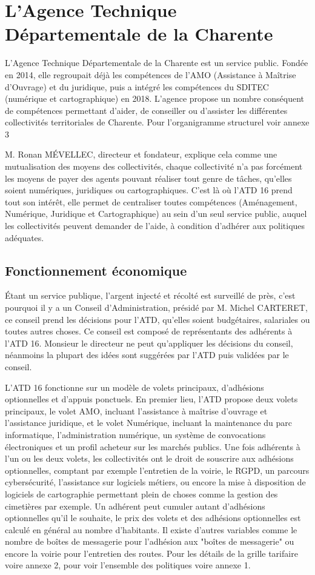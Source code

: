 \documentclass[a4paper,12pt]{report}
\begin{document}
\section{L'Agence Technique Départementale de la Charente}
L'Agence Technique Départementale de la Charente est un service public. Fondée en 2014, elle regroupait déjà les compétences de l'AMO (Assistance à Maîtrise d'Ouvrage) et du juridique, puis a intégré les compétences du SDITEC (numérique et cartographique) en 2018. L'agence propose un nombre conséquent de compétences permettant d'aider, de conseiller ou d'assister les différentes collectivités territoriales de Charente. Pour l'organigramme structurel voir annexe 3


M. Ronan MÉVELLEC, directeur et fondateur, explique cela comme une mutualisation des moyens des collectivités, chaque collectivité n'a pas forcément les moyens de payer des agents pouvant réaliser tout genre de tâches, qu'elles soient numériques, juridiques ou cartographiques. C'est là où l'ATD 16 prend tout son intérêt, elle permet de centraliser toutes compétences (Aménagement, Numérique, Juridique et Cartographique) au sein d'un seul service public, auquel les collectivités peuvent demander de l'aide, à condition d'adhérer aux politiques adéquates.

\subsection{Fonctionnement économique}

Étant un service publique, l'argent injecté et récolté est surveillé de près, c'est pourquoi il y a un Conseil d'Administration, présidé par M. Michel CARTERET, ce conseil prend les décisions pour l'ATD, qu'elles soient budgétaires, salariales ou toutes autres choses. Ce conseil est composé de représentants des adhérents à l'ATD 16. Monsieur le directeur ne peut qu'appliquer les décisions du conseil, néanmoins la plupart des idées sont suggérées par l'ATD puis validées par le conseil.

L'ATD 16 fonctionne sur un modèle de volets principaux, d'adhésions optionnelles et d'appuis ponctuels. En premier lieu, l'ATD propose deux volets principaux, le volet AMO, incluant l'assistance à maîtrise d'ouvrage et l'assistance juridique, et le volet Numérique, incluant la maintenance du parc informatique, l'administration numérique, un système de convocations électroniques et un profil acheteur sur les marchés publics. Une fois adhérents à l'un ou les deux volets, les collectivités ont le droit de souscrire aux adhésions optionnelles, comptant par exemple l'entretien de la voirie, le RGPD, un parcours cybersécurité, l'assistance sur logiciels métiers, ou encore la mise à disposition de logiciels de cartographie permettant plein de choses comme la gestion des cimetières par exemple. Un adhérent peut cumuler autant d'adhésions optionnelles qu'il le souhaite, le prix des volets et des adhésions optionnelles est calculé en général au nombre d'habitants. Il existe d'autres variables comme le nombre de boîtes de messagerie pour l'adhésion aux "boîtes de messagerie" ou encore la voirie pour l'entretien des routes. Pour les détails de la grille tarifaire voire annexe 2, pour voir l'ensemble des politiques voire annexe 1.
\end{document}
